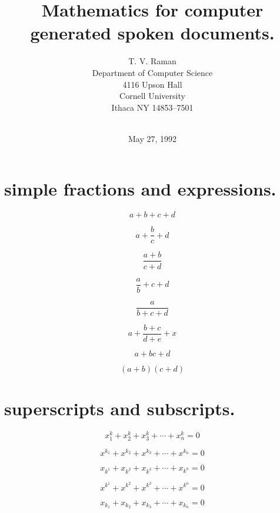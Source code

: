 


\title{Mathematics for computer generated spoken documents.}
\author{T. V. Raman\\
Department of Computer Science\\
4116 Upson Hall\\
Cornell University\\
Ithaca NY 14853--7501\\
\\
}
\date{May 27, 1992}
\maketitle


\section{simple fractions and expressions. }

$$a+b+c+d$$



$$a+\frac{b}{c} +d$$


$$\frac{a+b}{c+d}$$


$$\frac{a}{b}+c+d$$


$$\frac{a}{b+c+d}$$


$$a+\frac{b+c}{d+e}+x$$


$$a+bc+d$$


$$(a+b)(c+d)$$


\section{superscripts and subscripts.  }


$$x^k_1 +x^k_2 + x^k_3 + \cdots + x^k_n = 0$$

$$x^{k_1} + x^{k_2} + x^{k_3} + \cdots + x^{k_n} = 0$$

$$x_{k^1}+x_{k^2}+x_{k^3}+\cdots+x_{k^n}=0$$

$$x^{k^1}+x^{k^2}+x^{k^3}+\cdots+x^{k^n}=0$$

$$x_{k_1}+x_{k_2}+x_{k_3}+\cdots+x_{k_n}=0$$

